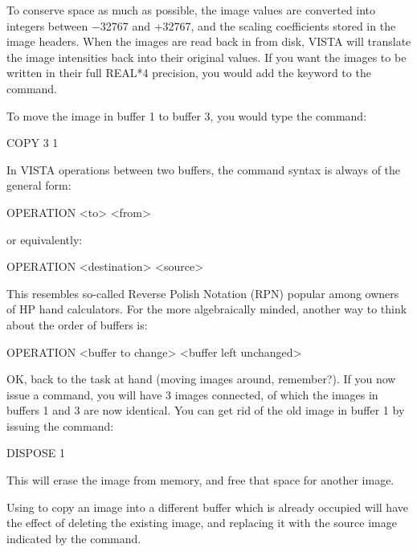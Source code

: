 {To conserve space as much as possible, the image values are converted into
integers between $-$32767 and +32767, and the scaling coefficients stored in
the image headers.  When the images are read back in from disk, VISTA will
translate the image intensities back into their original values.  If you want
the images to be written in their full REAL*4 precision, you would add the
 keyword to the  command.

\medskip

\nobreak
To move the image in buffer 1 to buffer 3, you would type the command:

\begin{command}
      \item COPY 3 1
\end{command}

\noindent In VISTA operations between two buffers, the command syntax is
always of the general form:
\begin{command}
      \item OPERATION <to> <from>
\end{command}

\noindent or equivalently:
\begin{command}
      \item OPERATION <destination> <source>
\end{command}

This resembles so-called Reverse Polish Notation (RPN) popular among owners
of HP hand calculators.  For the more algebraically minded, another way to
think about the order of buffers is:
\begin{command}
      \item OPERATION <buffer to change> <buffer left unchanged>
\end{command}

OK, back to the task at hand (moving images around, remember?).  If you
now issue a  command, you will have 3 images connected, of
which the images in buffers 1 and 3 are now identical.  You can
get rid of the old image in buffer 1 by issuing the command:

\begin{command}
      \item DISPOSE 1
\end{command}

This will erase the image from memory, and free that space for another image.

Using  to copy an image into a different buffer which is already
occupied will have the effect of deleting the existing image, and replacing it
with the source image indicated by the  command.


}

